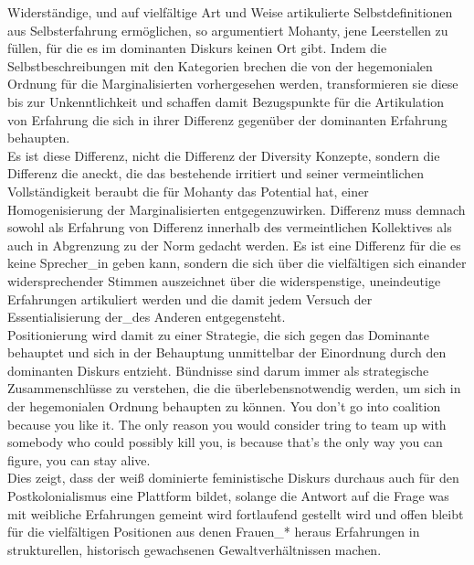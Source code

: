 Widerständige, und auf vielfältige Art und Weise artikulierte
Selbstdefinitionen aus Selbsterfahrung ermöglichen, so argumentiert Mohanty,
jene Leerstellen zu füllen, für die es im dominanten Diskurs keinen Ort gibt.
Indem die Selbstbeschreibungen mit den Kategorien brechen die von der
hegemonialen Ordnung für die Marginalisierten vorhergesehen werden,
transformieren sie diese bis zur Unkenntlichkeit und schaffen damit
Bezugspunkte für die Artikulation von Erfahrung die sich in ihrer Differenz
gegenüber der dominanten Erfahrung behaupten.\footnotemark{}\\

\noindent Es ist diese Differenz, nicht die Differenz der Diversity Konzepte, sondern die
Differenz die aneckt, die das bestehende irritiert und seiner vermeintlichen
Vollständigkeit beraubt die für Mohanty das Potential hat, einer
Homogenisierung der Marginalisierten entgegenzuwirken. Differenz muss demnach
sowohl als Erfahrung von Differenz innerhalb des vermeintlichen Kollektives als
auch in Abgrenzung zu der Norm gedacht werden. Es ist eine Differenz für die es
keine Sprecher\_in geben kann, sondern die sich über die vielfältigen sich
einander widersprechender Stimmen\footnotemark {} auszeichnet über die widerspenstige,
uneindeutige Erfahrungen artikuliert werden und die damit jedem Versuch der
Essentialisierung der\_des Anderen entgegensteht. \\
Positionierung wird damit zu
einer Strategie, die sich gegen das Dominante behauptet und sich in der
Behauptung unmittelbar der Einordnung durch den dominanten Diskurs entzieht.
Bündnisse sind darum immer als strategische Zusammenschlüsse zu verstehen, die
die überlebensnotwendig werden, um sich in der hegemonialen Ordnung behaupten
zu können. \glqq You don't go into coalition because you like it. The only reason
you would consider tring to team up with somebody who could possibly kill you,
is because that's the only way you can figure, you can stay alive.\grqq
\footnotemark {}\\

\noindent Dies zeigt, dass der weiß dominierte feministische Diskurs durchaus auch für
den Postkolonialismus eine Plattform bildet, solange die Antwort auf die Frage
was mit weibliche Erfahrungen gemeint wird fortlaufend gestellt wird und offen
bleibt für die vielfältigen Positionen aus denen Frauen\_* heraus Erfahrungen
in strukturellen, historisch gewachsenen Gewaltverhältnissen machen.

